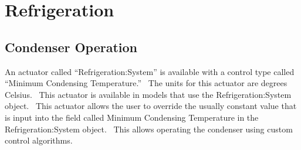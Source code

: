 \section{Refrigeration}\label{refrigeration}

\subsection{Condenser Operation}\label{condenser-operation}

An actuator called ``Refrigeration:System'' is available with a control type called ``Minimum Condensing Temperature.''~ The units for this actuator are degrees Celsius.~ This actuator is available in models that use the Refrigeration:System object.~ This actuator allows the user to override the usually constant value that is input into the field called Minimum Condensing Temperature in the Refrigeration:System object.~ This allows operating the condenser using custom control algorithms.
